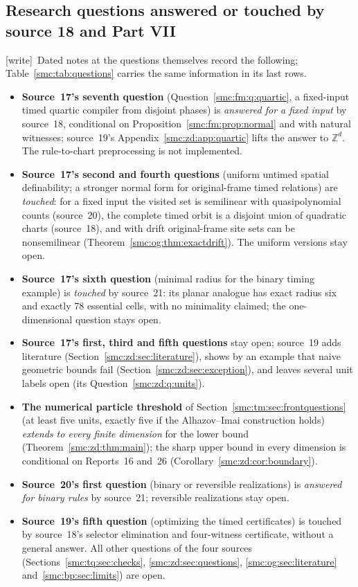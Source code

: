 \documentclass[11pt,letterpaper]{article}
\numberwithin{equation}{section}
\theoremstyle{definition}
\theoremstyle{remark}
\newcommand{\Z}{\mathbb Z}
\newcommand{\wtag}{\textup{[write]}}
\begin{document}
\subsection{Research questions answered or touched by source 18 and Part VII}\label{smc:zd:sec:frontquestions}

\wtag\ Dated notes at the questions themselves record the following; Table~\ref{smc:tab:questions} carries the same information in its last rows.
\begin{itemize}
\item \textbf{Source~17's seventh question} (Question~\ref{smc:fm:q:quartic}, a fixed-input timed quartic compiler from disjoint phases) is \emph{answered for a fixed input} by source~18, conditional on Proposition~\ref{smc:fm:prop:normal} and with natural witnesses; source~19's Appendix~\ref{smc:zd:app:quartic} lifts the answer to $\Z^d$. The rule-to-chart preprocessing is not implemented.
\item \textbf{Source~17's second and fourth questions} (uniform untimed spatial definability; a stronger normal form for original-frame timed relations) are \emph{touched}: for a fixed input the visited set is semilinear with quasipolynomial counts (source~20), the complete timed orbit is a disjoint union of quadratic charts (source~18), and with drift original-frame site sets can be nonsemilinear (Theorem~\ref{smc:og:thm:exactdrift}). The uniform versions stay open.
\item \textbf{Source~17's sixth question} (minimal radius for the binary timing example) is \emph{touched} by source~21: its planar analogue has exact radius six and exactly 78 essential cells, with no minimality claimed; the one-dimensional question stays open.
\item \textbf{Source~17's first, third and fifth questions} stay open; source~19 adds literature (Section~\ref{smc:zd:sec:literature}), shows by an example that naive geometric bounds fail (Section~\ref{smc:zd:sec:exception}), and leaves several unit labels open (its Question~\ref{smc:zd:q:units}).
\item \textbf{The numerical particle threshold} of Section~\ref{smc:tm:sec:frontquestions} (at least five units, exactly five if the Alhazov--Imai construction holds) \emph{extends to every finite dimension} for the lower bound (Theorem~\ref{smc:zd:thm:main}); the sharp upper bound in every dimension is conditional on Reports~16 and~26 (Corollary~\ref{smc:zd:cor:boundary}).
\item \textbf{Source~20's first question} (binary or reversible realizations) is \emph{answered for binary rules} by source~21; reversible realizations stay open.
\item \textbf{Source~19's fifth question} (optimizing the timed certificates) is touched by source~18's selector elimination and four-witness certificate, without a general answer. All other questions of the four sources (Sections~\ref{smc:tq:sec:checks}, \ref{smc:zd:sec:questions}, \ref{smc:og:sec:literature} and~\ref{smc:bp:sec:limits}) are open.
\end{itemize}
\end{document}
